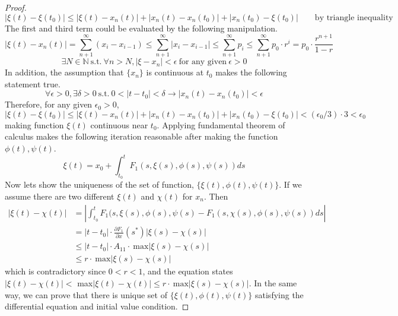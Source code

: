 \documentclass[a4paper,10pt]{article}
\begin{document}
\begin{proof}
\begin{displaymath}
            |\xi(t) - \xi(t_0)| \leq |\xi(t) - x_n(t)| + |x_n(t) - x_n(t_0)| + |x_n(t_0) - \xi(t_0)| \qquad \text{by triangle inequality} 
        \end{displaymath}
        The first and third term could be evaluated by the following manipulation.
        \begin{displaymath}
            |\xi(t) - x_n(t)| = \sum_{n+1}^{\infty} (x_i - x_{i-1}) \leq \sum_{n+1}^{\infty} |x_i - x_{i-1}| \leq \sum_{n+1}^{\infty} p_i \leq \sum_{n+1}^{\infty} p_0 \cdot r^{i} = p_0 \cdot \frac{r^{n+1}}{1-r}
        \end{displaymath}
        \begin{displaymath}
            \exists N \in \mathbb{N} \ \text{s.t.} \ \forall n > N, |\xi - x_n| < \epsilon \ \text{for any given} \ \epsilon > 0
        \end{displaymath}
        In addition, the assumption that $\{ x_n\}$ is continuous at $t_0$ makes the following statement true.
        \begin{displaymath}
            \forall \epsilon > 0, \exists \delta > 0 \ \text{s.t.} \ 0 < |t - t_0| < \delta \longrightarrow |x_{n}(t) - x_{n}(t_0)| < \epsilon
        \end{displaymath}
        Therefore, for any given $\epsilon_0 > 0$,
        \begin{displaymath}
            |\xi(t) - \xi(t_0)| \leq |\xi(t) - x_n(t)| + |x_n(t) - x_n(t_0)| + |x_n(t_0) - \xi(t_0)| < (\epsilon_0 / 3) \cdot 3 < \epsilon_0
        \end{displaymath}
        making function $\xi(t)$ continuous near $t_0$. Applying fundamental theorem of calculus makes the following iteration reasonable after making the function $\phi(t), \psi(t)$.
        \begin{displaymath}
            \xi(t) = x_0 + \int_{t_0}^{t} F_1(s, \xi(s), \phi(s), \psi(s)) ds
        \end{displaymath}
        Now lets show the uniqueness of the set of function, $\{ \xi(t), \phi(t), \psi(t) \}$. If we assume there are two different $\xi(t)$ and $\chi(t)$ for $x_n$. Then
        \begin{align*}
            |\xi(t) - \chi(t)| &= \left| \int_{t_0}^{t} F_1(s, \xi(s), \phi(s), \psi(s) - F_1(s, \chi(s), \phi(s), \psi(s)) ds \right| \\ 
            &= |t-t_0| \cdot \frac{\partial F_1}{\partial x}(s^{*})|\xi(s) - \chi(s)| \\ 
            &\leq |t-t_0| \cdot A_{11} \cdot \ \text{max} |\xi(s) - \chi(s)| \\
            &\leq r \cdot \ \text{max} |\xi(s) - \chi(s)|
        \end{align*}
        which is contradictory since $0<r<1$, and the equation states $|\xi(t) - \chi(t)| <$ max$|\xi(t) - \chi(t)| \leq r \cdot \ \text{max} |\xi(s) - \chi(s)|$. In the same way, we can prove that there is unique set of $\{ \xi(t), \phi(t), \psi(t) \}$ satisfying the differential equation and initial value condition.

    \end{proof} 
    
\end{document}
